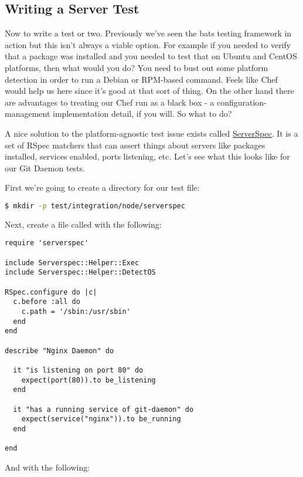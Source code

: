 \subsection{Writing a Server Test}

Now to write a test or two. Previously we've seen the bats testing framework in action but this isn't always a viable option. For example if you needed to verify that a package was installed and you needed to test that on Ubuntu and CentOS platforms, then what would you do? You need to bust out some platform detection in order to run a Debian or RPM-based command. Feels like Chef would help us here since it's good at that sort of thing. On the other hand there are advantages to treating our Chef run as a black box - a configuration-management implementation detail, if you will. So what to do?

A nice solution to the platform-agnostic test issue exists called \href{http://serverspec.org/}{ServerSpec}. It is a set of RSpec matchers that can assert things about servers like packages installed, services enabled, ports listening, etc. Let's see what this looks like for our Git Daemon tests.

First we're going to create a directory for our test file:

\begin{lstlisting}[language=Bash,label=lst:testing-test-kitchen36]
$ mkdir -p test/integration/node/serverspec
\end{lstlisting}

Next, create a file called  with the following:

\begin{lstlisting}[label=lst:testing-test-kitchen37]
require 'serverspec'

include Serverspec::Helper::Exec
include Serverspec::Helper::DetectOS

RSpec.configure do |c|
  c.before :all do
    c.path = '/sbin:/usr/sbin'
  end
end

describe "Nginx Daemon" do

  it "is listening on port 80" do
    expect(port(80)).to be_listening
  end

  it "has a running service of git-daemon" do
    expect(service("nginx")).to be_running
  end

end
\end{lstlisting}

And  with the following:

